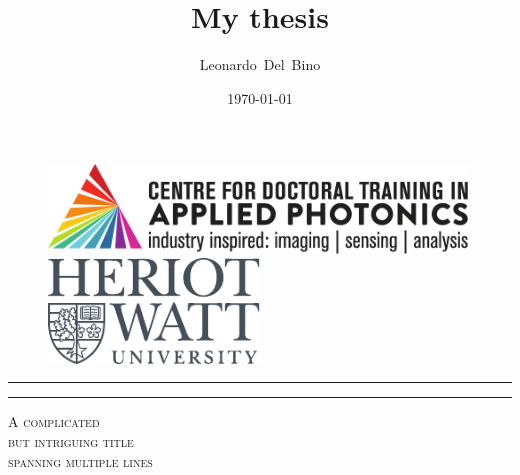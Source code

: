 \begin{titlepage}
\begin{figure}
    \centering
    \begin{minipage}{0.49\textwidth}
        \centering
        \includegraphics[width=0.99\textwidth]{./fig/CDT-Photonics-Logo.pdf} %
   \end{minipage}\hfill
    \begin{minipage}{0.49\textwidth}
        \centering
        \includegraphics[width=0.5\textwidth]{./fig/HW-Logo.pdf} %
    \end{minipage}
\end{figure}

\title{My thesis} %
\author{Leonardo~Del~Bino}
\date{\today}

	\centering %


	\rule{\textwidth}{1.6pt}\vspace*{-\baselineskip}\vspace*{2pt} %
	\rule{\textwidth}{0.4pt} %

	\vspace{0.5\baselineskip} %

	{\linespread{1.2}\scshape \huge A complicated\\
		but intriguing title\\
		spanning multiple lines\\} %


\end{titlepage}
